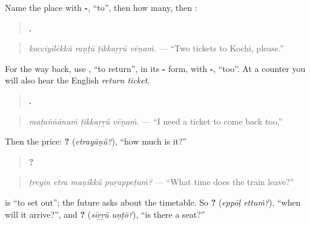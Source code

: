 \begin{grammarlens}[title={Grammar Lens: at the counter}]
Name the place with \textbf{-}, \textquotedblleft{}to\textquotedblright{}, then how many, then \textbf{}:

\begin{quote}
\textbf{   .}
\end{quote}

\begin{quote}
\emph{kocciyilēkkŭ raṇṭŭ ṭikkaṟṟŭ vēṇaṁ.} — \textquotedblleft{}Two tickets to Kochi, please.\textquotedblright{}
\end{quote}

For the way back, use \textbf{}, \textquotedblleft{}to return\textquotedblright{}, in its \textbf{-} form, with \textbf{-}, \textquotedblleft{}too\textquotedblright{}. At a counter you will also hear the English \emph{return ticket}.

\begin{quote}
\textbf{  .}
\end{quote}

\begin{quote}
\emph{maṭaṅṅānuṁ ṭikkaṟṟŭ vēṇaṁ.} — \textquotedblleft{}I need a ticket to come back too.\textquotedblright{}
\end{quote}

Then the price: \textbf{?} (\emph{etrayāṇŭ?}), \textquotedblleft{}how much is it?\textquotedblright{}
\end{grammarlens}

\begin{grammarlens}[title={Grammar Lens: times and seats}]
\begin{quote}
\textbf{   ?}
\end{quote}

\begin{quote}
\emph{ṭreyin etra maṇikkŭ puṟappeṭuṁ?} — \textquotedblleft{}What time does the train leave?\textquotedblright{}
\end{quote}

\textbf{} is \textquotedblleft{}to set out\textquotedblright{}; the future \textbf{} asks about the timetable. So \textbf{ ?} (\emph{eppōḷ ettuṁ?}), \textquotedblleft{}when will it arrive?\textquotedblright{}, and \textbf{ ?} (\emph{sīṟṟŭ uṇṭō?}), \textquotedblleft{}is there a seat?\textquotedblright{}
\end{grammarlens}

